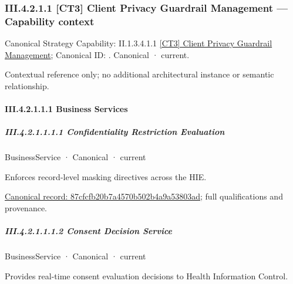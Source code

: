 \subsubsection*{III.4.2.1.1 [CT3] Client Privacy Guardrail Management — Capability context}
\label{navigation:III.4.2.1.1}

{\small Canonical Strategy Capability: II.1.3.4.1.1 \hyperref[element:7577a6e1815243648dd5356c21cca151]{[CT3] Client Privacy Guardrail Management}; Canonical ID: \texttt{}. Canonical · current.}\par
Contextual reference only; no additional architectural instance or semantic relationship.\par
\paragraph*{III.4.2.1.1.1 Business Services}
\label{navigation:III.4.2.1.1.1}

\subparagraph*{III.4.2.1.1.1.1 Confidentiality Restriction Evaluation}
\label{navigation:III.4.2.1.1.1.1}

\label{element:87cfcfb20b7a4570b502b4a9a53803ad}
{\small BusinessService · Canonical · current}\par

Enforces record-level masking directives across the HIE.


{\footnotesize \href{../../../../../../../continuum/business/business-service/87cfcfb20b7a4570b502b4a9a53803ad.md}{Canonical record: 87cfcfb20b7a4570b502b4a9a53803ad}; full qualifications and provenance.}\par
\subparagraph*{III.4.2.1.1.1.2 Consent Decision Service}
\label{navigation:III.4.2.1.1.1.2}

\label{element:e1bebefbdbef4a1981ec31341eb71dfd}
{\small BusinessService · Canonical · current}\par

Provides real-time consent evaluation decisions to Health Information Control.


